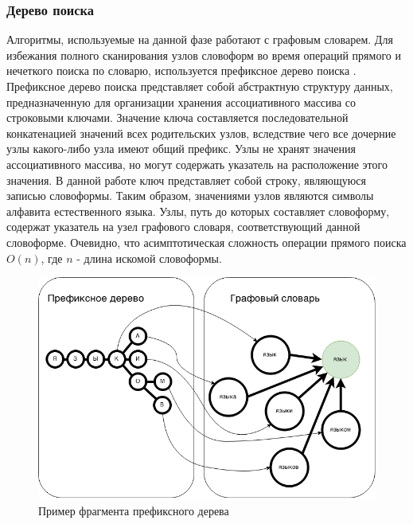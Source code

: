 \subsubsection{Дерево поиска}
Алгоритмы, используемые на данной фазе работают с графовым словарем. Для избежания полного сканирования узлов словоформ во время операций прямого и нечеткого поиска по словарю, используется префиксное дерево поиска \cite{knuth}. Префиксное дерево поиска представляет собой абстрактную структуру данных, предназначенную для организации хранения ассоциативного массива со строковыми ключами. Значение ключа составляется последовательной конкатенацией значений всех родительских узлов, вследствие чего все дочерние узлы какого-либо узла имеют общий префикс. Узлы не хранят значения ассоциативного массива, но могут содержать указатель на расположение этого значения. В данной работе ключ представляет собой строку, являющуюся записью словоформы. Таким образом, значениями узлов являются символы алфавита естественного языка. Узлы, путь до которых составляет словоформу, содержат указатель на узел графового словаря, соответствующий данной словоформе. Очевидно, что асимптотическая сложность операции прямого поиска \(O(n)\), где \(n\) - длина искомой словоформы.
\begin{figure}[H]
	\centering
	\includegraphics[scale=0.6]{img/prefixtree.png}
	\caption{Пример фрагмента префиксного дерева}
\end{figure}

